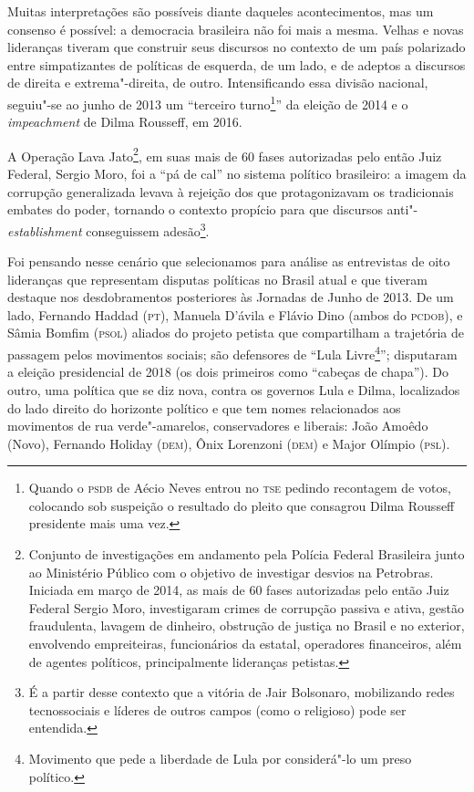 Muitas interpretações são possíveis diante daqueles acontecimentos, mas
um consenso é possível: a democracia brasileira não foi mais a mesma.
Velhas e novas lideranças tiveram que construir seus discursos no
contexto de um país polarizado entre simpatizantes de políticas de
esquerda, de um lado, e de adeptos a discursos de direita e
extrema"-direita, de outro. Intensificando essa divisão nacional,
seguiu"-se ao junho de 2013 um ``terceiro turno\footnote{Quando o \textsc{psdb} de
  Aécio Neves entrou no \textsc{tse} pedindo recontagem de votos, colocando sob
  suspeição o resultado do pleito que consagrou Dilma Rousseff
  presidente mais uma vez.}'' da eleição de 2014 e o \emph{impeachment}
de Dilma Rousseff, em 2016.

A Operação Lava Jato\footnote{Conjunto de investigações em andamento
  pela Polícia Federal Brasileira junto ao Ministério Público com o
  objetivo de investigar desvios na Petrobras. Iniciada em março de
  2014, as mais de 60 fases autorizadas pelo então Juiz Federal Sergio
  Moro, investigaram crimes de corrupção passiva e ativa, gestão
  fraudulenta, lavagem de dinheiro, obstrução de justiça no Brasil e no
  exterior, envolvendo empreiteiras, funcionários da estatal, operadores
  financeiros, além de agentes políticos, principalmente lideranças
  petistas.}, em suas mais de 60 fases autorizadas pelo então Juiz
Federal, Sergio Moro, foi a ``pá de cal'' no sistema político
brasileiro: a imagem da corrupção generalizada levava à rejeição dos que
protagonizavam os tradicionais embates do poder, tornando o contexto
propício para que discursos anti"-\emph{establishment} conseguissem
adesão\footnote{É a partir desse contexto que a vitória de Jair
  Bolsonaro, mobilizando redes tecnossociais e líderes de outros campos
  (como o religioso) pode ser entendida.}.

Foi pensando nesse cenário que selecionamos para análise as entrevistas
de oito lideranças que representam disputas políticas no Brasil atual e
que tiveram destaque nos desdobramentos posteriores às Jornadas de Junho
de 2013. De um lado, Fernando Haddad (\textsc{pt}), Manuela D'ávila e Flávio Dino
(ambos do \textsc{pcdob}), e Sâmia Bomfim (\textsc{psol}) aliados do projeto petista que
compartilham a trajetória de passagem pelos movimentos sociais; são
defensores de ``Lula Livre\footnote{Movimento que pede a liberdade de
  Lula por considerá"-lo um preso político.}''; disputaram a eleição
presidencial de 2018 (os dois primeiros como ``cabeças de chapa''). Do
outro, uma política que se diz nova, contra os governos Lula e Dilma,
localizados do lado direito do horizonte político e que tem nomes
relacionados aos movimentos de rua verde"-amarelos, conservadores e
liberais: João Amoêdo (Novo), Fernando Holiday (\textsc{dem}), Ônix Lorenzoni
(\textsc{dem}) e Major Olímpio (\textsc{psl}).

